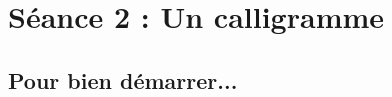 \vfill





%
%
%










\newpage


\section{Séance 2 : Un calligramme}\label{ficheImage4e1}


\subsection{Pour bien démarrer...}

